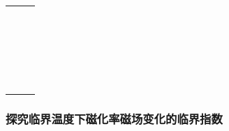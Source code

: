 \documentclass[11pt,a4paper]{ctexart}
\begin{document}
\begin{enumerate}
\begin{table}[H]
\begin{tabular}{|p{32mm}|p{32mm}|p{32mm}|}
  &  &\\ \hline
  &  &\\ \hline
  &  &\\ \hline
  &  &\\ \hline
  &  &\\ \hline
  &  &\\ \hline
  &  &\\ \hline
  &  &\\ \hline
  &  &\\ \hline
  &  &\\ \hline
  &  &\\ \hline
    & &\\ \hline
  & &\\ \hline
   & &\\ \hline
     &  &\\ \hline
  &  &\\ \hline
  &  &\\ \hline
  &  &\\ \hline
  &  &\\ \hline
  &  &\\ \hline
  &  &\\ \hline
  &  &\\ \hline
    & &\\ \hline
  & &\\ \hline
   & &\\ \hline
  \end{tabular}
  \end{table}
 \end{enumerate}
\subsubsection{探究临界温度下磁化率磁场变化的临界指数}
\end{document}
